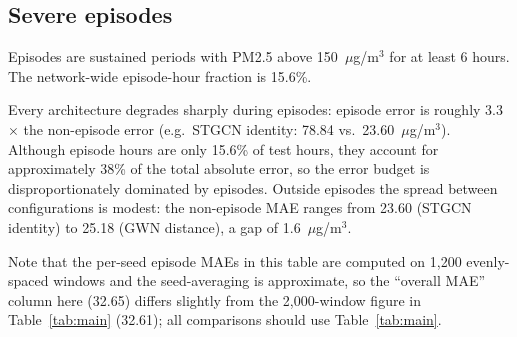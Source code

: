 \documentclass[11pt,a4paper]{article}
\begin{document}
\subsection{Severe episodes}
\label{sec:episodes}

Episodes are sustained periods with PM2.5 above 150~$\mu$g/m$^3$ for at least
6 hours.  The network-wide episode-hour fraction is 15.6\%.

\begin{table}[htbp]
\centering
\small
\caption{Test performance inside and outside severe episodes ($\mu$g/m$^3$).
Episode error is roughly 2--3$\times$ non-episode error for every architecture.}
\label{tab:episodes}
\end{table}

Every architecture degrades sharply during episodes: episode error is roughly
3.3$\times$ the non-episode error (e.g.\ STGCN identity: 78.84 vs.\
23.60~$\mu$g/m$^3$).  Although episode hours are only 15.6\% of test hours,
they account for approximately 38\% of the total absolute error, so the
error budget is disproportionately dominated by episodes.  Outside episodes
the spread between configurations is modest: the non-episode MAE ranges from
23.60 (STGCN identity) to 25.18 (GWN distance), a gap of 1.6~$\mu$g/m$^3$.

Note that the per-seed episode MAEs in this table are computed on 1{,}200
evenly-spaced windows and the seed-averaging is approximate, so the ``overall
MAE'' column here (32.65) differs slightly from the 2{,}000-window figure in
Table~\ref{tab:main} (32.61); all comparisons should use Table~\ref{tab:main}.
\end{document}
